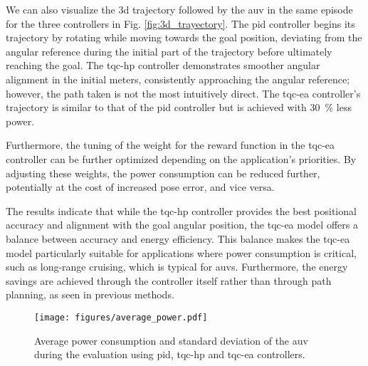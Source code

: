 We can also visualize the \ac{3d} trajectory followed by the \ac{auv} in the same episode for the three controllers in Fig. \ref{fig:3d_trayectory}. The \ac{pid} controller begins its trajectory by rotating while moving towards the goal position, deviating from the angular reference during the initial part of the trajectory before ultimately reaching the goal. The \ac{tqc-hp} controller demonstrates smoother angular alignment in the initial meters, consistently approaching the angular reference; however, the path taken is not the most intuitively direct. The \ac{tqc-ea} controller's trajectory is similar to that of the \ac{pid} controller but is achieved with \SI{30}{\percent} less power.

Furthermore, the tuning of the weight for the reward function in the \ac{tqc-ea} controller can be further optimized depending on the application's priorities. By adjusting these weights, the power consumption can be reduced further, potentially at the cost of increased pose error, and vice versa.

The results indicate that while the \ac{tqc-hp} controller provides the best positional accuracy and alignment with the goal angular position, the \ac{tqc-ea} model offers a balance between accuracy and energy efficiency. This balance makes the \ac{tqc-ea} model particularly suitable for applications where power consumption is critical, such as long-range cruising, which is typical for \acp{auv}. Furthermore, the energy savings are achieved through the controller itself rather than through path planning, as seen in previous methods.

\begin{figure}[t!]
\centering
\texttt{[image: figures/average\_power.pdf]}%
\caption{Average power consumption and standard deviation of the \ac{auv} during the evaluation using \ac{pid}, \ac{tqc-hp} and \ac{tqc-ea} controllers.}
\label{fig:power}
\end{figure}